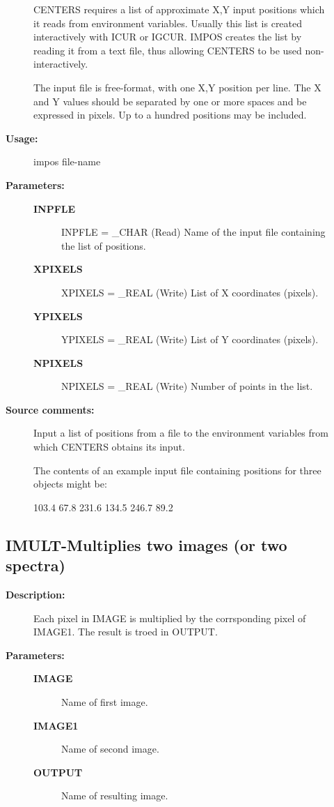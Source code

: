 \begin{description}
\begin{description}
 CENTERS requires a list of approximate X,Y input positions which
 it reads from environment variables.  Usually this list is created
 interactively with ICUR or IGCUR.  IMPOS creates the list by
 reading it from a text file, thus allowing CENTERS to be used
 non-interactively.

 The input file is free-format, with one X,Y position per line.
 The X and Y values should be separated by one or more spaces and
 be expressed in pixels.  Up to a hundred positions may be included.

\item [\textbf{Usage:}]
 impos file-name

\item [\textbf{Parameters:}]
\begin{description}
\item [\textbf{INPFLE}]
INPFLE  =  \_CHAR (Read)
   Name of the input file containing the list of positions.
\item [\textbf{XPIXELS}]
XPIXELS  = \_REAL (Write)
   List of X coordinates (pixels).
\item [\textbf{YPIXELS}]
YPIXELS  = \_REAL (Write)
  List of Y coordinates (pixels).
\item [\textbf{NPIXELS}]
NPIXELS  =  \_REAL (Write)
  Number of points in the list.
\end{description}

\item [\textbf{Source comments:}]
\begin{terminalv}
 Input a list of positions from a file to the environment variables
 from which CENTERS obtains its input.

 The contents of an example input file containing positions for
 three objects might be:

      103.4   67.8
      231.6  134.5
      246.7   89.2
\end{terminalv}
\end{description}
\subsection{IMULT-\label{IMULT}Multiplies two images (or two spectra)}
\begin{description}

\item [\textbf{Description:}]
 Each pixel in IMAGE is multiplied by the corrsponding
 pixel of IMAGE1.  The result is troed in OUTPUT.

\item [\textbf{Parameters:}]
\begin{description}
\item [\textbf{IMAGE}]
 Name of first image.
\item [\textbf{IMAGE1}]
 Name of second image.
\item [\textbf{OUTPUT}]
 Name of resulting image.
\end{description}


\end{description}
\end{description}
